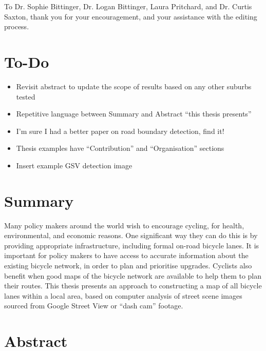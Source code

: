 \documentclass[11pt,twoside]{report}
\begin{document}
To Dr. Sophie Bittinger, Dr. Logan Bittinger, Laura Pritchard, and Dr. Curtis Saxton, thank you for your encouragement, and your assistance with the editing process.



\chapter*{To-Do}

\begin{itemize}
\item{Revisit abstract to update the scope of results based on any other suburbs tested}
\item{Repetitive language between Summary and Abstract ``this thesis presents''}
\item{I'm sure I had a better paper on road boundary detection, find it!}
\item{Thesis examples have ``Contribution'' and ``Organisation'' sections}
\item{Insert example GSV detection image}
\end{itemize}

\chapter*{Summary}

Many policy makers around the world wish to encourage cycling, for health, environmental, and economic reasons.  One significant way they can do this is by providing appropriate infrastructure, including formal on-road bicycle lanes.  It is important for policy makers to have access to accurate information about the existing bicycle network, in order to plan and prioritise upgrades.  Cyclists also benefit when good maps of the bicycle network are available to help them to plan their routes.  This thesis presents an approach to constructing a map of all bicycle lanes within a local area, based on computer analysis of street scene  images sourced from Google Street View or ``dash cam'' footage.

\begingroup
\renewcommand{\cleardoublepage}{}
\renewcommand{\clearpage}{}
\chapter*{Abstract}
\endgroup
\end{document}

